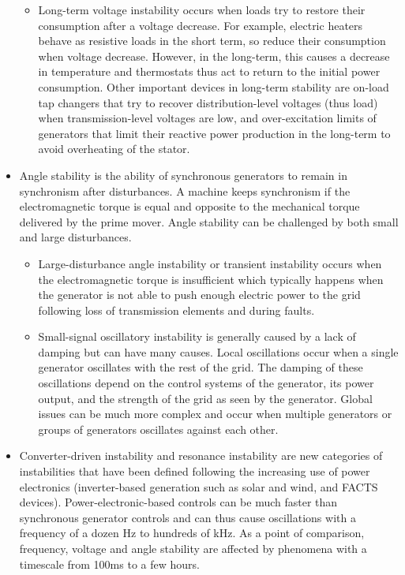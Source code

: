 \begin{itemize}
\begin{itemize}
        \item Long-term voltage instability occurs when loads try to restore their consumption after a voltage decrease. For example, electric heaters behave as resistive loads in the short term, so reduce their consumption when voltage decrease. However, in the long-term, this causes a decrease in temperature and thermostats thus act to return to the initial power consumption. Other important devices in long-term stability are on-load tap changers that try to recover distribution-level voltages (thus load) when transmission-level voltages are low, and over-excitation limits of generators that limit their reactive power production in the long-term to avoid overheating of the stator.
    \end{itemize}
    \item Angle stability is the ability of synchronous generators to remain in synchronism after disturbances. A machine keeps synchronism if the electromagnetic torque is equal and opposite to the mechanical torque delivered by the prime mover. Angle stability can be challenged by both small and large disturbances.
    \begin{itemize}
        \item Large-disturbance angle instability or transient instability occurs when the electromagnetic torque is insufficient which typically happens when the generator is not able to push enough electric power to the grid following loss of transmission elements and during faults.
        \item Small-signal oscillatory instability is generally caused by a lack of damping but can have many causes. Local oscillations occur when a single generator oscillates with the rest of the grid. The damping of these oscillations depend on the control systems of the generator, its power output, and the strength of the grid as seen by the generator. Global issues can be much more complex and occur when multiple generators or groups of generators oscillates against each other.
    \end{itemize}
    \item Converter-driven instability and resonance instability are new categories of instabilities that have been defined following the increasing use of power electronics (inverter-based generation such as solar and wind, and FACTS devices). Power-electronic-based controls can be much faster than synchronous generator controls and can thus cause oscillations with a frequency of a dozen Hz to hundreds of kHz. As a point of comparison, frequency, voltage and angle stability are affected by phenomena with a timescale from 100ms to a few hours.
\end{itemize}

